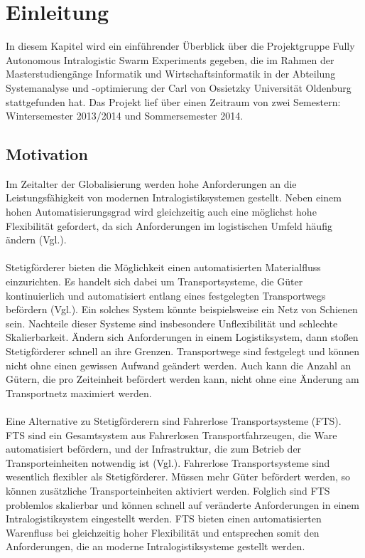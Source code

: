 \section{Einleitung}
In diesem Kapitel wird ein einführender Überblick über die Projektgruppe Fully Autonomous Intralogistic Swarm Experiments gegeben, die im Rahmen der Masterstudiengänge Informatik und Wirtschaftsinformatik in der Abteilung Systemanalyse und -optimierung der Carl von Ossietzky Universität Oldenburg stattgefunden hat. Das Projekt lief über einen Zeitraum von zwei Semestern: Wintersemester 2013/2014 und Sommersemester 2014.


\subsection{Motivation}
Im Zeitalter der Globalisierung werden hohe Anforderungen an die Leistungsfähigkeit von modernen Intralogistiksystemen gestellt. Neben einem hohen Automatisierungsgrad wird gleichzeitig auch eine möglichst hohe Flexibilität gefordert, da sich Anforderungen im logistischen Umfeld häufig ändern (Vgl.\cite{ieft}).    
\\\\
Stetigförderer bieten die Möglichkeit einen automatisierten Materialfluss einzurichten. Es handelt sich dabei um Transportsysteme, die Güter kontinuierlich und automatisiert entlang eines festgelegten Transportwegs befördern (Vgl.\cite{stf}). Ein solches System könnte beispielsweise ein Netz von Schienen sein. Nachteile dieser Systeme sind insbesondere Unflexibilität und schlechte Skalierbarkeit. Ändern sich Anforderungen in einem Logistiksystem, dann stoßen Stetigförderer schnell an ihre Grenzen. Transportwege sind festgelegt und können nicht ohne einen gewissen Aufwand geändert werden. Auch kann die Anzahl an Gütern, die pro Zeiteinheit befördert werden kann, nicht ohne eine Änderung am Transportnetz maximiert werden.
\\\\
Eine Alternative zu Stetigförderern sind Fahrerlose Transportsysteme (FTS). FTS sind ein Gesamtsystem aus Fahrerlosen Transportfahrzeugen, die Ware automatisiert befördern, und der Infrastruktur, die zum Betrieb der Transporteinheiten notwendig ist (Vgl.\cite{fts}). Fahrerlose Transportsysteme sind wesentlich flexibler als Stetigförderer. Müssen mehr Güter befördert werden, so können zusätzliche Transporteinheiten aktiviert werden. Folglich sind FTS problemlos skalierbar und können schnell auf veränderte Anforderungen in einem Intralogistiksystem eingestellt werden. FTS bieten einen automatisierten Warenfluss bei gleichzeitig hoher Flexibilität und entsprechen somit den Anforderungen, die an moderne Intralogistiksysteme gestellt werden.  
\\\\

